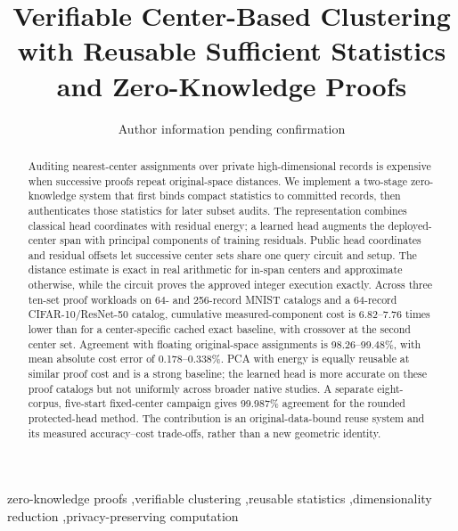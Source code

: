 \documentclass[5p,times,twocolumn]{elsarticle}
\theoremstyle{plain}
\theoremstyle{definition}
\theoremstyle{remark}
\begin{document}
\begin{frontmatter}
\title{Verifiable Center-Based Clustering with Reusable Sufficient Statistics and Zero-Knowledge Proofs}
\author{Author information pending confirmation}
\begin{abstract}
Auditing nearest-center assignments over private high-dimensional records is expensive when successive proofs repeat original-space distances. We implement a two-stage zero-knowledge system that first binds compact statistics to committed records, then authenticates those statistics for later subset audits. The representation combines classical head coordinates with residual energy; a learned head augments the deployed-center span with principal components of training residuals. Public head coordinates and residual offsets let successive center sets share one query circuit and setup. The distance estimate is exact in real arithmetic for in-span centers and approximate otherwise, while the circuit proves the approved integer execution exactly. Across three ten-set proof workloads on 64- and 256-record MNIST catalogs and a 64-record CIFAR-10/ResNet-50 catalog, cumulative measured-component cost is 6.82--7.76 times lower than for a center-specific cached exact baseline, with crossover at the second center set. Agreement with floating original-space assignments is 98.26--99.48\%, with mean absolute cost error of 0.178--0.338\%. PCA with energy is equally reusable at similar proof cost and is a strong baseline; the learned head is more accurate on these proof catalogs but not uniformly across broader native studies. A separate eight-corpus, five-start fixed-center campaign gives 99.987\% agreement for the rounded protected-head method. The contribution is an original-data-bound reuse system and its measured accuracy--cost trade-offs, rather than a new geometric identity.
\end{abstract}
\begin{keyword}
zero-knowledge proofs \sep verifiable clustering \sep reusable statistics \sep dimensionality reduction \sep privacy-preserving computation
\end{keyword}
\end{frontmatter}







\FloatBarrier
\onecolumn
\appendix
{}
\renewcommand{\thetable}{\Alph{section}.\arabic{table}}
\renewcommand{\theHtable}{appendix.\Alph{section}.\arabic{table}}
\renewcommand{\theHequation}{appendix.\Alph{section}.\arabic{equation}}

\FloatBarrier
\twocolumn
\end{document}

